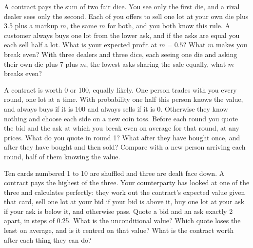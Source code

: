 \begin{question}\label{iq:iv2:making-a-market:28}
A contract pays the sum of two fair dice. You see only the first die, and a rival dealer sees only the second. Each of you offers to sell one lot at your own die plus 3.5 plus a markup $m$, the same $m$ for both, and you both know this rule. A customer always buys one lot from the lower ask, and if the asks are equal you each sell half a lot. What is your expected profit at $m = 0.5$? What $m$ makes you break even? With three dealers and three dice, each seeing one die and asking their own die plus 7 plus $m$, the lowest asks sharing the sale equally, what $m$ breaks even?
\end{question}

\begin{question}\label{iq:iv2:making-a-market:29}
A contract is worth 0 or 100, equally likely. One person trades with you every round, one lot at a time. With probability one half this person knows the value, and always buys if it is 100 and always sells if it is 0. Otherwise they know nothing and choose each side on a new coin toss. Before each round you quote the bid and the ask at which you break even on average for that round, at any prices. What do you quote in round 1? What after they have bought once, and after they have bought and then sold? Compare with a new person arriving each round, half of them knowing the value.
\end{question}

\begin{question}\label{iq:iv2:making-a-market:30}
Ten cards numbered 1 to 10 are shuffled and three are dealt face down. A contract pays the highest of the three. Your counterparty has looked at one of the three and calculates perfectly: they work out the contract's expected value given that card, sell one lot at your bid if your bid is above it, buy one lot at your ask if your ask is below it, and otherwise pass. Quote a bid and an ask exactly 2 apart, in steps of 0.25. What is the unconditional value? Which quote loses the least on average, and is it centred on that value? What is the contract worth after each thing they can do?
\end{question}

